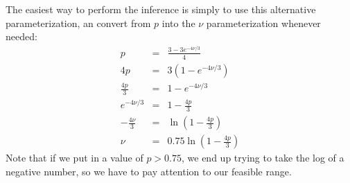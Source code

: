 \documentclass[11pt]{article}
\newcommand{\myA}{e^{-4\nu/3}}
\begin{document}
The easiest way to perform the inference is simply to use this alternative parameterization,
an convert from $p$ into the $\nu$ parameterization whenever needed:
\begin{eqnarray}
p & = & \frac{3 - 3 \myA}{4} \\
4 p &= & 3(1 - \myA) \\
\frac{4p}{3} & = & 1 -\myA \\
\myA &  = & 1 - \frac{4p}{3} \\
-\frac{4\nu}{3} &= & \ln\left(1 - \frac{4p}{3}\right) \\
\nu & = &  0.75 \ln\left(1 - \frac{4p}{3}\right)
\end{eqnarray}
Note that if we put in a value of $p > 0.75$, we end up trying to take the log of a negative number, so we have to pay attention to our feasible range.
\end{document}
